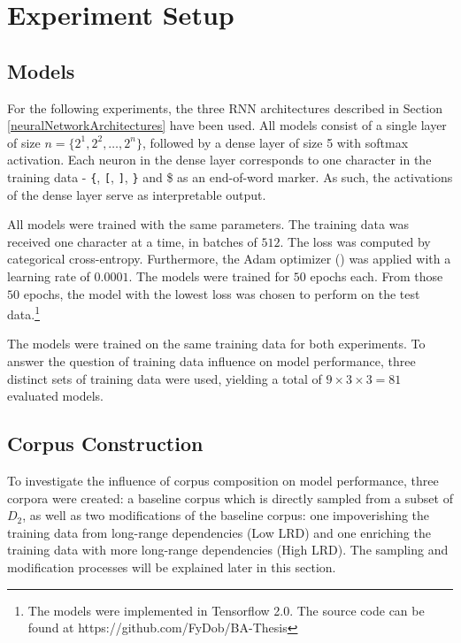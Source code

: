 \section{Experiment Setup}\label{experimentSetup}

\subsection{Models}\label{models}
For the following experiments, the three RNN architectures described in Section \ref{neuralNetworkArchitectures} have been used. All models consist of a single layer of size $n = \lbrace 2^{1}, 2^{2}, \dots, 2^{n} \rbrace$, followed by a dense layer of size 5 with softmax activation. Each neuron in the dense layer corresponds to one character in the training data - \texttt{\{}, \texttt{[}, \texttt{]}, \texttt{\}} and \$ as an end-of-word marker. As such, the activations of the dense layer serve as interpretable output.

All models were trained with the same parameters. The training data was received one character at a time, in batches of $512$. The loss was computed by categorical cross-entropy. Furthermore, the Adam optimizer (\cite{Kingma2014}) was applied with a learning rate of $0.0001$. The models were trained for $50$ epochs each. From those $50$ epochs, the model with the lowest loss was chosen to perform on the test data.\footnote{The models were implemented in Tensorflow 2.0. The source code can be found at https://github.com/FyDob/BA-Thesis}

The models were trained on the same training data for both experiments. To answer the question of training data influence on model performance, three distinct sets of training data were used, yielding a total of $9 \times 3 \times 3 = 81$ evaluated models.

\subsection{Corpus Construction}\label{corpusConstruction}
To investigate the influence of corpus composition on model performance, three corpora were created: a baseline corpus which is directly sampled from a subset of $D_{2}$, as well as two modifications of the baseline corpus: one impoverishing the training data from long-range dependencies (Low LRD) and one enriching the training data with more long-range dependencies (High LRD). The sampling and modification processes will be explained later in this section.

